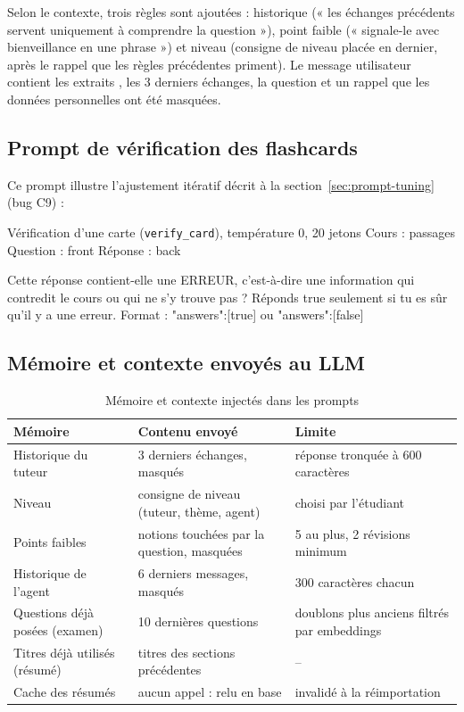 \documentclass[12pt,a4paper]{report}
\DeclareRobustCommand{\code}[1]{\texttt{\codecasse{#1}}}
\begin{document}
Selon le contexte, trois règles sont ajoutées : historique (« les échanges précédents servent uniquement
à comprendre la question »), point faible (« signale-le avec bienveillance en une phrase ») et niveau
(consigne de niveau placée en dernier, après le rappel que les règles précédentes priment). Le message
utilisateur contient les extraits \code{[p.X]}, les 3 derniers échanges, la question et un rappel que les
données personnelles ont été masquées.

\subsection{Prompt de vérification des flashcards}

Ce prompt illustre l'ajustement itératif décrit à la section~\ref{sec:prompt-tuning} (bug C9) :

\begin{prompt}{Vérification d'une carte (\texttt{verify\_card}), température 0, 20 jetons}
Cours : {passages}
Question : {front}
Réponse : {back}

Cette réponse contient-elle une ERREUR, c'est-à-dire une information qui contredit le cours ou
qui ne s'y trouve pas ? Réponds true seulement si tu es sûr qu'il y a une erreur.
Format : {"answers":[true]} ou {"answers":[false]}
\end{prompt}

\subsection{Mémoire et contexte envoyés au LLM}

\begin{table}[htbp]
\centering
\caption{Mémoire et contexte injectés dans les prompts}
\label{tab:memoire}
\begin{tabularx}{\textwidth}{@{}P{3.4cm}LP{3.6cm}@{}}
\toprule
\textbf{Mémoire} & \textbf{Contenu envoyé} & \textbf{Limite} \\
\midrule
Historique du tuteur & 3 derniers échanges, masqués & réponse tronquée à 600 caractères \\
Niveau & consigne de niveau (tuteur, thème, agent) & choisi par l'étudiant \\
Points faibles & notions touchées par la question, masquées & 5 au plus, 2 révisions minimum \\
Historique de l'agent & 6 derniers messages, masqués & 300 caractères chacun \\
Questions déjà posées (examen) & 10 dernières questions & doublons plus anciens filtrés par embeddings \\
Titres déjà utilisés (résumé) & titres des sections précédentes & -- \\
Cache des résumés & aucun appel : relu en base & invalidé à la réimportation \\
\bottomrule
\end{tabularx}
\end{table}
\end{document}
